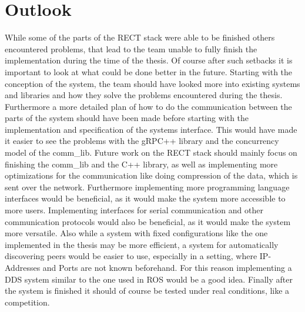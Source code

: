 \section{Outlook}
While some of the parts of the RECT stack were able to be finished others encountered problems, that lead to the team unable to fully finish the implementation during the time of the thesis.
Of course after such setbacks it is important to look at what could be done better in the future. Starting with the conception of the system, the team should have looked more into existing
systems and libraries and how they solve the problems encountered during the thesis. Furthermore a more detailed plan of how to do the communication between the parts of the system should have been made
before starting with the implementation and specification of the systems interface. This would have made it easier to see the problems with the gRPC++ library and the concurrency model of the comm\_lib.
Future work on the RECT stack should mainly focus on finishing the comm\_lib and the C++ library, as well as implementing more optimizations for the communication like doing compression of the data, which is sent over the network.
Furthermore implementing more programming language interfaces would be beneficial, as it would make the system more accessible to more users. Implementing interfaces for serial communication and other communication protocols would
also be beneficial, as it would make the system more versatile. Also while a system with fixed configurations like the one implemented in the thesis may be more efficient, a system for automatically discovering peers would be easier
to use, especially in a setting, where IP-Addresses and Ports are not known beforehand. For this reason implementing a DDS system similar to the one used in ROS would be a good idea. Finally after the system is finished it should
of course be tested under real conditions, like a competition.

\filbreak